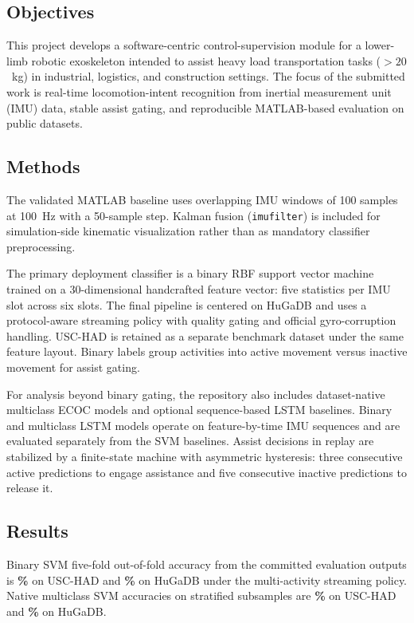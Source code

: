 \subsection*{Objectives}
This project develops a software-centric control-supervision module for a lower-limb robotic exoskeleton intended to assist heavy load transportation tasks ($>20$~kg) in industrial, logistics, and construction settings. The focus of the submitted work is real-time locomotion-intent recognition from inertial measurement unit (IMU) data, stable assist gating, and reproducible MATLAB-based evaluation on public datasets.

\subsection*{Methods}
The validated MATLAB baseline uses overlapping IMU windows of 100 samples at 100~Hz with a 50-sample step. Kalman fusion (\texttt{imufilter}) is included for simulation-side kinematic visualization rather than as mandatory classifier preprocessing.

The primary deployment classifier is a binary RBF support vector machine trained on a 30-dimensional handcrafted feature vector: five statistics per IMU slot across six slots. The final pipeline is centered on HuGaDB and uses a protocol-aware streaming policy with quality gating and official gyro-corruption handling. USC-HAD is retained as a separate benchmark dataset under the same feature layout. Binary labels group activities into active movement versus inactive movement for assist gating.

For analysis beyond binary gating, the repository also includes dataset-native multiclass ECOC models and optional sequence-based LSTM baselines. Binary and multiclass LSTM models operate on feature-by-time IMU sequences and are evaluated separately from the SVM baselines. Assist decisions in replay are stabilized by a finite-state machine with asymmetric hysteresis: three consecutive active predictions to engage assistance and five consecutive inactive predictions to release it.

\subsection*{Results}
Binary SVM five-fold out-of-fold accuracy from the committed evaluation outputs is \textbf{\BinaryOofAccUsc\%} on USC-HAD and \textbf{\BinaryOofAccHuGa\%} on HuGaDB under the multi-activity streaming policy. Native multiclass SVM accuracies on stratified subsamples are \textbf{\MulticlassOofAccUsc\%} on USC-HAD and \textbf{\MulticlassOofAccHuGa\%} on HuGaDB.

